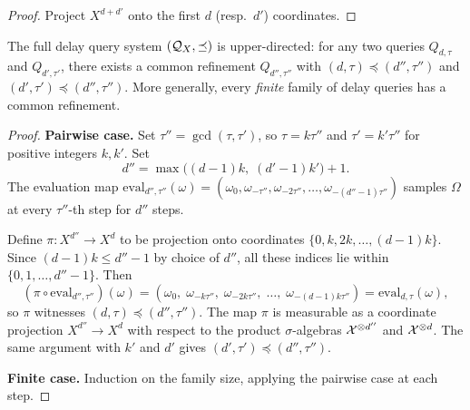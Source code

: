 \begin{proof}
Project $X^{d+d'}$ onto the first $d$ (resp.\ $d'$) coordinates.
\end{proof}

\begin{proposition}\label{prop:upper-directed-general}
The full delay query system $(\mathcal{Q}_X, \preceq)$ is upper-directed: for any
two queries $Q_{d,\tau}$ and $Q_{d',\tau'}$, there exists a common refinement
$Q_{d'',\tau''}$ with $(d,\tau) \preceq (d'',\tau'')$ and
$(d',\tau') \preceq (d'',\tau'')$.  More generally, every \emph{finite}
family of delay queries has a common refinement.
\end{proposition}

\begin{proof}
\textbf{Pairwise case.}
Set $\tau'' = \gcd(\tau, \tau')$, so $\tau = k\tau''$ and $\tau' = k'\tau''$
for positive integers $k, k'$.  Set
\[
  d'' = \max\!\bigl((d-1)k,\; (d'-1)k'\bigr) + 1.
\]
The evaluation map $\mathrm{eval}_{d'',\tau''}(\omega)
= (\omega_0, \omega_{-\tau''}, \omega_{-2\tau''}, \ldots, \omega_{-(d''-1)\tau''})$
samples $\Omega$ at every $\tau''$-th step for $d''$ steps.

Define $\pi : X^{d''} \to X^d$ to be projection onto coordinates
$\{0, k, 2k, \ldots, (d-1)k\}$.  Since $(d-1)k \leq d'' - 1$ by choice
of $d''$, all these indices lie within $\{0, 1, \ldots, d''-1\}$.  Then
\[
  (\pi \circ \mathrm{eval}_{d'',\tau''})(\omega)
  = (\omega_0,\; \omega_{-k\tau''},\; \omega_{-2k\tau''},\; \ldots,\;
    \omega_{-(d-1)k\tau''})
  = \mathrm{eval}_{d,\tau}(\omega),
\]
so $\pi$ witnesses $(d,\tau) \preceq (d'',\tau'')$.  The map $\pi$ is
measurable as a coordinate projection $X^{d''} \to X^d$ with respect to
the product $\sigma$-algebras $\mathcal{X}^{\otimes d''}$ and $\mathcal{X}^{\otimes d}$.
The same argument with $k'$ and $d'$ gives $(d',\tau') \preceq (d'',\tau'')$.

\textbf{Finite case.}
Induction on the family size, applying the pairwise case at each step.
\end{proof}

